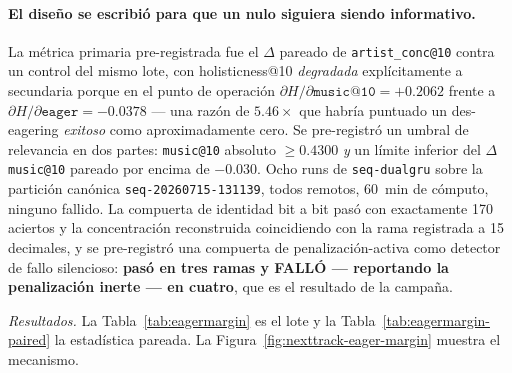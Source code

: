\documentclass[11pt]{article}
\newcommand{\dsid}[1]{\texttt{\small #1}}
\begin{document}
\paragraph{El diseño se escribió para que un nulo siguiera siendo informativo.} La
métrica primaria pre-registrada fue el $\Delta$ pareado de
\texttt{artist\_conc@10} contra un control del mismo lote, con holisticness@10
\emph{degradada} explícitamente a secundaria porque en el punto de operación
$\partial H/\partial\texttt{music@10} = +\num{0.2062}$ frente a
$\partial H/\partial\texttt{eager} = -\num{0.0378}$ --- una razón de
$\num{5.46}\times$ que habría puntuado un des-eagering \emph{exitoso} como
aproximadamente cero. Se pre-registró un umbral de relevancia en dos partes:
\texttt{music@10} absoluto $\ge\num{0.4300}$ \emph{y} un límite inferior del
$\Delta$\texttt{music@10} pareado por encima de $-\num{0.030}$. Ocho runs de
\texttt{seq-dualgru} sobre la partición canónica \dsid{seq-20260715-131139}, todos
remotos, \SI{60}{\minute} de cómputo, ninguno fallido. La compuerta de identidad
bit a bit pasó con exactamente \num{170} aciertos y la concentración reconstruida
coincidiendo con la rama registrada a \num{15} decimales, y se pre-registró una
compuerta de penalización-activa como detector de fallo silencioso: \textbf{pasó en
tres ramas y FALLÓ --- reportando la penalización inerte --- en cuatro}, que es el
resultado de la campaña.

\emph{Resultados.} La Tabla~\ref{tab:eagermargin} es el lote y la
Tabla~\ref{tab:eagermargin-paired} la estadística pareada. La
Figura~\ref{fig:nexttrack-eager-margin} muestra el mecanismo.
\end{document}
